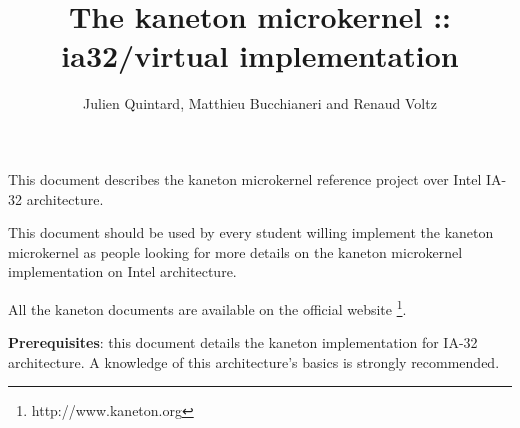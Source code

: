 
%
%

\def\path{../../..}

%
%



%
%

\rhead{}

%
%

\title{The kaneton microkernel :: ia32/virtual implementation
       \logos}

%
%

\author{\small{Julien Quintard},
        \small{Matthieu Bucchianeri} and
        \small{Renaud Voltz}}

%
%



%
%

\maketitle

%
%

This document describes the kaneton microkernel reference project over
Intel IA-32 architecture.

This document should be used by every student willing implement the
kaneton microkernel as people looking for more details on the kaneton
microkernel implementation on Intel architecture.

All the kaneton documents are available on
the official website
  \footnote{http://www.kaneton.org}.

\textbf{Prerequisites}: this document details the kaneton implementation
for IA-32 architecture. A knowledge of this architecture's basics is
strongly recommended.

%
%

\tableofcontents

%
%











